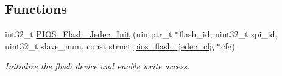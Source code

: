 \subsection*{\-Functions}
\begin{DoxyCompactItemize}
\item 
int32\-\_\-t \hyperlink{group___p_i_o_s___f_l_a_s_h_ga9a23c23702dd0004514c87ce4a5520dc}{\-P\-I\-O\-S\-\_\-\-Flash\-\_\-\-Jedec\-\_\-\-Init} (uintptr\-\_\-t $\ast$flash\-\_\-id, uint32\-\_\-t spi\-\_\-id, uint32\-\_\-t slave\-\_\-num, const struct \hyperlink{structpios__flash__jedec__cfg}{pios\-\_\-flash\-\_\-jedec\-\_\-cfg} $\ast$cfg)
\begin{DoxyCompactList}\small\item\em \-Initialize the flash device and enable write access. \end{DoxyCompactList}\end{DoxyCompactItemize}
